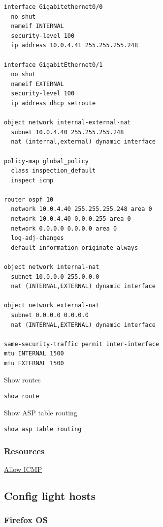 \documentclass[11pt,parskip=half]{scrartcl}
\begin{document}
\begin{lstlisting}[basicstyle=\small, frame=single]
interface Gigabitethernet0/0
  no shut
  nameif INTERNAL
  security-level 100
  ip address 10.0.4.41 255.255.255.248

interface GigabitEthernet0/1
  no shut
  nameif EXTERNAL
  security-level 100
  ip address dhcp setroute

object network internal-external-nat
  subnet 10.0.4.40 255.255.255.248
  nat (internal,external) dynamic interface

policy-map global_policy
  class inspection_default
  inspect icmp

router ospf 10
  network 10.0.4.40 255.255.255.248 area 0
  network 10.0.4.40 0.0.0.255 area 0
  network 0.0.0.0 0.0.0.0 area 0
  log-adj-changes
  default-information originate always

object network internal-nat
  subnet 10.0.0.0 255.0.0.0
  nat (INTERNAL,EXTERNAL) dynamic interface

object network external-nat
  subnet 0.0.0.0 0.0.0.0
  nat (INTERNAL,EXTERNAL) dynamic interface

same-security-traffic permit inter-interface
mtu INTERNAL 1500
mtu EXTERNAL 1500
\end{lstlisting}

Show routes

\begin{verbatim}
show route
\end{verbatim}

Show ASP table routing

\begin{verbatim}
show asp table routing
\end{verbatim}

\subsubsection{{\bfseries\sffamily } Resources}
\label{sec:org985a263}

\href{https://www.speaknetworks.com/enable-icmp-inspection-to-allow-ping-traffic-passing-asa/}{Allow ICMP}

\subsection{{\bfseries\sffamily } Config light hosts}
\label{sec:org6f323cf}
\subsubsection{{\bfseries\sffamily } Firefox OS}
\label{sec:org7fa7c9d}
\end{document}
